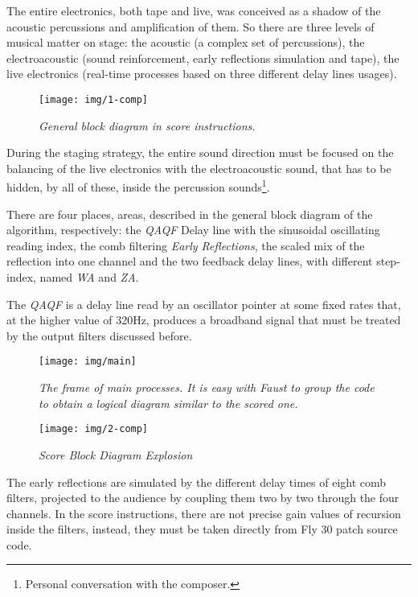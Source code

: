 \documentclass[twoside,a4paper]{article}
\begin{document}
The entire electronics, both tape and live, was conceived as a shadow of the
acoustic percussions and amplification of them. So there are three levels of
musical matter on stage: the acoustic (a complex set of percussions), the
electroacoustic (sound reinforcement, early reflections simulation and tape),
the live electronics (real-time processes based on three different delay lines
usages).

\begin{figure}[ht]
\centerline{\texttt{[image: img/1-comp]}}
\caption{\label{ml-gen-dia}{\it General block diagram in score instructions.}}
\end{figure}

During the staging strategy, the entire sound direction must be focused on the
balancing of the live electronics with the electroacoustic sound, that has to be
hidden, by all of these, inside the percussion sounds\footnote{Personal
conversation with the composer.}.

There are four places, areas, described in the general block diagram of the
algorithm, respectively: the \emph{QAQF} Delay line with the sinusoidal oscillating
reading index, the comb filtering \emph{Early Reflections}, the scaled mix of
the reflection into one channel and the two feedback delay lines, with different
step-index, named \emph{WA} and \emph{ZA}.

The \emph{QAQF} is a delay line read by an oscillator pointer at some fixed rates
that, at the higher value of 320Hz, produces a broadband signal that must be
treated by the output filters discussed before.

\begin{figure}[hb]
\centerline{\texttt{[image: img/main]}}
\caption{\label{ml-main}{\it The frame of main processes. It is easy with Faust
to group the code to obtain a logical diagram similar to the scored one. }}
\end{figure}

\begin{figure}[ht]
\centerline{\texttt{[image: img/2-comp]}}
\caption{\label{ml-dia-exp}{\it Score Block Diagram Explosion}}
\end{figure}

The early reflections are simulated by the different delay times of eight comb
filters, projected to the audience by coupling them two by two through the four
channels. In the score instructions, there are not precise gain values of recursion
inside the filters, instead, they must be taken directly from Fly 30 patch source
code.
\end{document}
